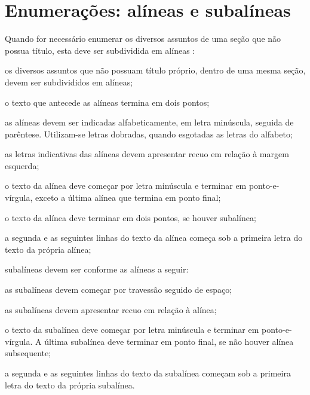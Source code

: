 
\section{Enumerações: alíneas e subalíneas}

Quando for necessário enumerar os diversos assuntos de uma seção que não possua título, esta deve ser
subdividida em alíneas \cite[seção 4.2]{NBR6024:2012}:

\begin{alineas}

  \item os diversos assuntos que não possuam título próprio, dentro de uma mesma   seção, devem ser subdivididos em alíneas; 
  \item o texto que antecede as alíneas termina em dois pontos;
  \item as alíneas devem ser indicadas alfabeticamente, em letra minúscula, seguida de parêntese. Utilizam-se letras dobradas, quando esgotadas as letras do alfabeto;
  \item as letras indicativas das alíneas devem apresentar recuo em relação à margem esquerda;
  \item o texto da alínea deve começar por letra minúscula e terminar em ponto-e-vírgula, exceto a última alínea que termina em ponto final;
  \item o texto da alínea deve terminar em dois pontos, se houver subalínea;
  \item a segunda e as seguintes linhas do texto da alínea começa sob a primeira letra do texto da própria alínea;
  \item subalíneas \cite[seção 4.3]{NBR6024:2012} devem ser conforme as alíneas a   seguir:

  \begin{alineas}
     \item as subalíneas devem começar por travessão seguido de espaço;
     \item as subalíneas devem apresentar recuo em relação à alínea;
     \item o texto da subalínea deve começar por letra minúscula e terminar em ponto-e-vírgula. A última subalínea deve terminar em ponto final, se não houver alínea subsequente;
     \item a segunda e as seguintes linhas do texto da subalínea começam sob a primeira letra do texto da própria subalínea.
  \end{alineas}
  

\end{alineas}
